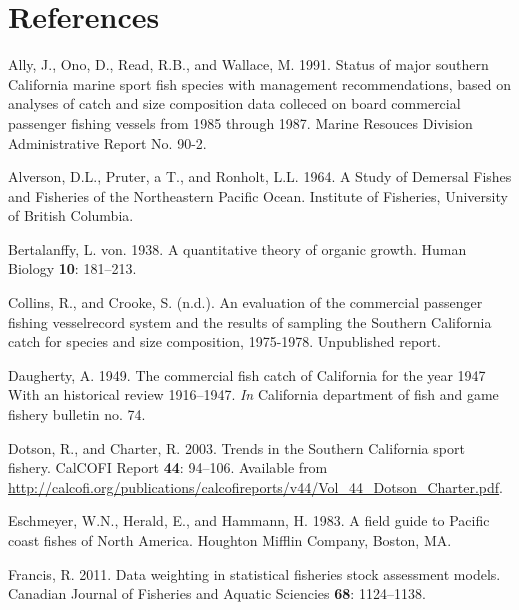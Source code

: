 \documentclass[12pt,]{article}
\begin{document}
\newpage

\color{black}

\section*{References}\label{references}

\renewcommand{\thepage}{}

\hypertarget{refs}{}
\hypertarget{ref-Ally1991}{}
Ally, J., Ono, D., Read, R.B., and Wallace, M. 1991. Status of major
southern California marine sport fish species with management
recommendations, based on analyses of catch and size composition data
colleced on board commercial passenger fishing vessels from 1985 through
1987. Marine Resouces Division Administrative Report No. 90-2.

\hypertarget{ref-Alverson1964}{}
Alverson, D.L., Pruter, a T., and Ronholt, L.L. 1964. A Study of
Demersal Fishes and Fisheries of the Northeastern Pacific Ocean.
Institute of Fisheries, University of British Columbia.

\hypertarget{ref-vonB1938}{}
Bertalanffy, L. von. 1938. A quantitative theory of organic growth.
Human Biology \textbf{10}: 181--213.

\hypertarget{ref-Collins1978}{}
Collins, R., and Crooke, S. (n.d.). An evaluation of the commercial
passenger fishing vesselrecord system and the results of sampling the
Southern California catch for species and size composition, 1975-1978.
Unpublished report.

\hypertarget{ref-Daugherty1949}{}
Daugherty, A. 1949. The commercial fish catch of California for the year
1947 With an historical review 1916--1947. \emph{In} California
department of fish and game fishery bulletin no. 74.

\hypertarget{ref-Dotson2003}{}
Dotson, R., and Charter, R. 2003. Trends in the Southern California
sport fishery. CalCOFI Report \textbf{44}: 94--106. Available from
\url{http://calcofi.org/publications/calcofireports/v44/Vol_44_Dotson_Charter.pdf}.

\hypertarget{ref-Eschmeyer1983}{}
Eschmeyer, W.N., Herald, E., and Hammann, H. 1983. A field guide to
Pacific coast fishes of North America. Houghton Mifflin Company, Boston,
MA.

\hypertarget{ref-Francis2011}{}
Francis, R. 2011. Data weighting in statistical fisheries stock
assessment models. Canadian Journal of Fisheries and Aquatic Sciencies
\textbf{68}: 1124--1138.
\end{document}
